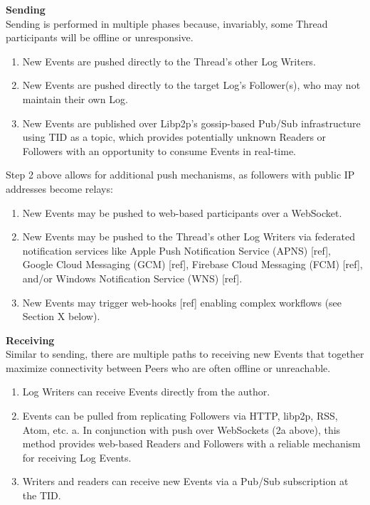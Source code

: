 \documentclass{comjnl}
\begin{document}
\textbf{Sending} \\

Sending is performed in multiple phases because, invariably, some Thread participants will be offline or unresponsive. 

\begin{enumerate}
\item \label{Perf1}New Events are pushed directly to the Thread’s other Log Writers.
\item \label{Perf2}New Events are pushed directly to the target Log’s Follower(s), who may not maintain their own Log.
\item \label{Perf3} New Events are published over Libp2p’s gossip-based Pub/Sub infrastructure using TID as a topic, which provides potentially unknown Readers or Followers with an opportunity to consume Events in real-time.
\end{enumerate}

Step 2 above allows for additional push mechanisms, as followers with public IP addresses become relays:

\begin{enumerate}
\item \label{Perf1}New Events may be pushed to web-based participants over a WebSocket.
\item \label{Perf2}New Events may be pushed to the Thread’s other Log Writers via federated notification services like Apple Push Notification Service (APNS) [ref], Google Cloud Messaging (GCM) [ref], Firebase Cloud Messaging (FCM) [ref], and/or Windows Notification Service (WNS) [ref].
\item \label{Perf3} New Events may trigger web-hooks [ref] enabling complex workflows (see Section X below).\\
\end{enumerate}

\textbf{Receiving} \\

Similar to sending, there are multiple paths to receiving new Events that together maximize connectivity between Peers who are often offline or unreachable.

\begin{enumerate}
\item \label{Perf1}Log Writers can receive Events directly from the author.
\item \label{Perf2} Events can be pulled from replicating Followers via HTTP, libp2p, RSS, Atom, etc.
    a. In conjunction with push over WebSockets (2a above), this method provides web-based Readers and Followers with a reliable mechanism for receiving Log Events.
\item \label{Perf3} Writers and readers can receive new Events via a Pub/Sub subscription at the TID.
\end{enumerate}
\end{document}

